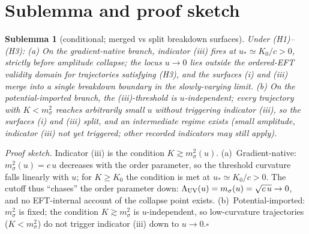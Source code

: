 \documentclass[11pt,a4paper]{article}
\newtheorem{sublemma}{Sublemma}
\begin{document}
\section{Sublemma and proof sketch}
\begin{sublemma}[conditional; merged vs split breakdown surfaces]
Under (H1)--(H3):
(a) On the gradient-native branch, indicator (iii) fires at
$u_*\simeq K_0/c>0$, strictly before amplitude collapse; the locus
$u\to0$ lies outside the ordered-EFT validity domain for trajectories
satisfying (H3), and the surfaces (i) and (iii) merge into a single breakdown
boundary in the slowly-varying limit.
(b) On the potential-imported branch, the (iii)-threshold is
$u$-independent; every trajectory with $K<m_\sigma^2$ reaches arbitrarily
small $u$ without triggering indicator (iii), so the surfaces (i) and (iii)
split, and an intermediate regime exists (small amplitude, indicator (iii)
not yet triggered; other recorded indicators may still apply).
\end{sublemma}
\emph{Proof sketch.} Indicator (iii) is the condition $K\gtrsim
m_\sigma^2(u)$. (a)~Gradient-native: $m_\sigma^2(u)=c\,u$ decreases with the
order parameter, so the threshold curvature falls linearly with $u$; for
$K\ge K_0$ the condition is met at $u_*\simeq K_0/c>0$. The cutoff thus
``chases'' the order parameter down: $\Lambda_{\rm UV}(u)=m_\sigma(u)=
\sqrt{c\,u}\to0$, and no EFT-internal account of the collapse point exists.
(b)~Potential-imported: $m_\sigma^2$ is fixed; the condition
$K\gtrsim m_\sigma^2$ is $u$-independent, so low-curvature trajectories
($K<m_\sigma^2$) do not trigger indicator (iii) down to
$u\to0$.\hfill$\square$
\end{document}
